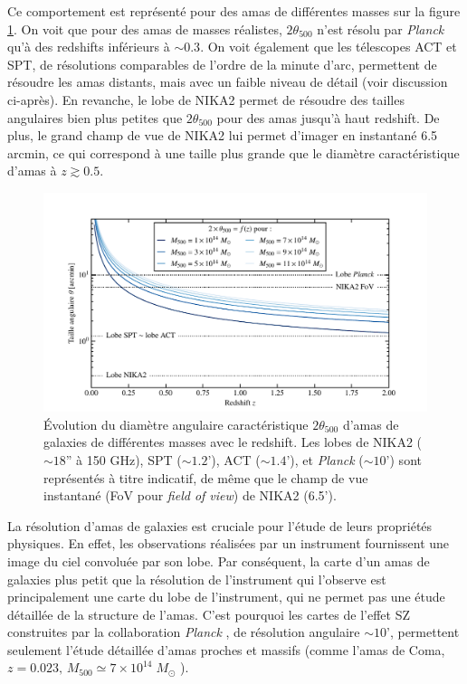 Ce comportement est représenté pour des amas de différentes masses sur la figure \ref{fig:nk_angular_sizes}.
On voit que pour des amas de masses réalistes, $2\theta_{500}$ n'est résolu par \textit{Planck} qu'à des redshifts inférieurs à $\sim 0.3$.
On voit également que les télescopes ACT et SPT, de résolutions comparables de l'ordre de la minute d'arc, permettent de résoudre les amas distants, mais avec un faible niveau de détail (voir discussion ci-après).
En revanche, le lobe de NIKA2 permet de résoudre des tailles angulaires bien plus petites que $2\theta_{500}$ pour des amas jusqu'à haut redshift.
De plus, le grand champ de vue de NIKA2 lui permet d'imager en instantané 6.5 arcmin, ce qui correspond à une taille plus grande que le diamètre caractéristique d'amas à $z \gtrsim 0.5$.

\begin{figure}[t]
    \centering
    \includegraphics[width=.85\linewidth]{Figures/chap_nk/angular_sizes.pdf}
    \caption{
        Évolution du diamètre angulaire caractéristique $2\theta_{500}$ d'amas de galaxies de différentes masses avec le redshift.
        Les lobes de NIKA2 ($\sim 18$'' à 150 GHz), SPT ($\sim 1.2$'), ACT ($\sim 1.4$'), et \textit{Planck} ($\sim 10$') sont représentés à titre indicatif, de même que le champ de vue instantané (FoV pour \textit{field of view}) de NIKA2 (6.5').
    }
    \label{fig:nk_angular_sizes}
\end{figure}

La résolution d'amas de galaxies est cruciale pour l'étude de leurs propriétés physiques.
En effet, les observations réalisées par un instrument fournissent une image du ciel convoluée par son lobe.
Par conséquent, la carte d'un amas de galaxies plus petit que la résolution de l'instrument qui l'observe est principalement une carte du lobe de l'instrument, qui ne permet pas une étude détaillée de la structure de l'amas.
C'est pourquoi les cartes de l'effet SZ construites par la collaboration \textit{Planck} \cite{planck_collaboration_planck_2016}, de résolution angulaire $\sim 10$', permettent seulement l'étude détaillée d'amas proches et massifs (comme l'amas de Coma, $z = 0.023, \, M_{500} \simeq 7 \times 10^{14} \;M_\odot$ \cite{ade_planck_2013}).

